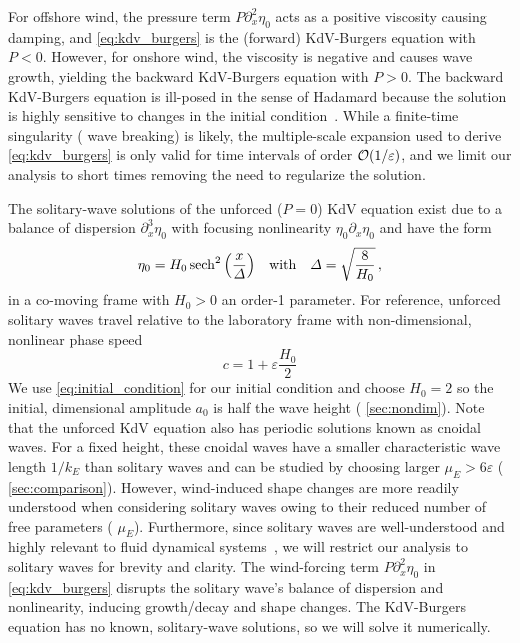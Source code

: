 \documentclass{jfm}
\renewcommand*{\epsilon}{\varepsilon}
\begin{document}
For offshore wind, the pressure term $P \partial^2_x \eta_0$ acts as a
positive viscosity causing damping, and \cref{eq:kdv_burgers} is the
(forward) KdV-Burgers equation with $P<0$.
However, for onshore wind, the viscosity is negative and causes wave
growth, yielding the backward KdV-Burgers equation with $P>0$.
The backward KdV-Burgers equation is ill-posed in the sense of Hadamard
because the solution is highly sensitive to changes in the initial
condition~\citep{hadamard1902problemes}.
While a finite-time singularity (\ie{} wave breaking) is likely, the
multiple-scale expansion used to derive \cref{eq:kdv_burgers} is only
valid for time intervals of order $\order{1/\epsilon}$, and we limit our
analysis to short times removing the need to regularize the solution.

The solitary-wave solutions of the unforced ($P=0$) KdV equation exist
due to a balance of dispersion $\partial_x^3 \eta_0$ with focusing
nonlinearity $\eta_0 \partial_x \eta_0$ and have the
form~\citep[\eg][]{mei2005nonlinear}
\begin{equation}
  \eta_0 = H_0 \sech^2\pqty{\frac{x}{\Delta}}
  \qq{with}
  \Delta = \sqrt{\frac{8}{H_0}} \,,
  \label{eq:initial_condition}
\end{equation}
in a co-moving frame with $H_0>0$ an order-1 parameter.
For reference, unforced solitary waves travel relative to the laboratory
frame with non-dimensional, nonlinear phase
speed~\citep[\eg][]{mei2005nonlinear}
\begin{equation}
  c = 1 + \epsilon \frac{H_0}{2}
  \label{eq:nonlin_phase_speed}
\end{equation}
We use \cref{eq:initial_condition} for our initial condition and choose
$H_0 = 2$ so the initial, dimensional amplitude $a_0$ is half the wave
height (\cf{} \cref{sec:nondim}).
Note that the unforced KdV equation also has periodic solutions
known as cnoidal waves.
For a fixed height, these cnoidal waves have a smaller characteristic
wave length $1/k_E$ than solitary waves and can be studied by choosing
larger $\mu_E > 6 \epsilon$ (\cf{} \cref{sec:comparison}).
However, wind-induced shape changes are more readily understood when
considering solitary waves owing to their reduced number of free
parameters (\ie{} $\mu_E$).
Furthermore, since solitary waves are well-understood and highly relevant to
fluid dynamical
systems~\citep[\eg][]{hammack1974korteweg,miles1979korteweg,lin1998numerical,monaghan1999solitary},
we will restrict our analysis to solitary waves for brevity and clarity.
The wind-forcing term $P \partial_x^2 \eta_0$ in \cref{eq:kdv_burgers}
disrupts the solitary wave's balance of dispersion and nonlinearity,
inducing growth/decay and shape changes.
The KdV-Burgers equation has no known, solitary-wave solutions, so we
will solve it numerically.
\end{document}
